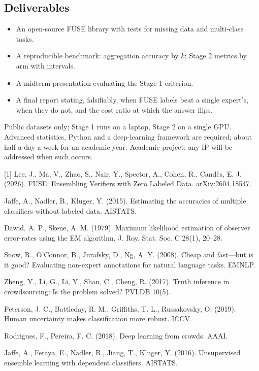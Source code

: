\documentclass[10pt]{article}
\newcommand{\secrule}[1]{\par\vspace{8pt}{\noindent\color{navy}\bfseries\fontsize{14}{16}\selectfont #1\par}\vspace{-5pt}{\color{navy}\rule{\linewidth}{0.7pt}}\par\vspace{1pt}}
\begin{document}
\subsection*{Deliverables}
\begin{itemize}
\item An open-source FUSE library with tests for missing data and multi-class tasks.
\item A reproducible benchmark: aggregation accuracy by $k$; Stage 2 metrics by arm with intervals.
\item A midterm presentation evaluating the Stage 1 criterion.
\item A final report stating, falsifiably, when FUSE labels beat a single expert's, when they do not, and the cost ratio at which the answer flips.
\end{itemize}

\secrule{Resources}

Public datasets only; Stage 1 runs on a laptop, Stage 2 on a single GPU. Advanced statistics, Python and a deep-learning framework are required; about half a day a week for an academic year. Academic project; any IP will be addressed when such occurs.

\secrule{Reference materials}

{\fontsize{8}{9.6}\selectfont
\setlength{\parskip}{1.5pt}\setlength{\parindent}{-12pt}\leftskip=12pt
[1] Lee, J., Ma, V., Zhao, S., Nair, Y., Spector, A., Cohen, R., Cand\`es, E. J. (2026). FUSE: Ensembling Verifiers with Zero Labeled Data. arXiv:2604.18547.\par
[2] Jaffe, A., Nadler, B., Kluger, Y. (2015). Estimating the accuracies of multiple classifiers without labeled data. AISTATS.\par
[3] Dawid, A. P., Skene, A. M. (1979). Maximum likelihood estimation of observer error-rates using the EM algorithm. J. Roy. Stat. Soc. C 28(1), 20--28.\par
[4] Snow, R., O'Connor, B., Jurafsky, D., Ng, A. Y. (2008). Cheap and fast---but is it good? Evaluating non-expert annotations for natural language tasks. EMNLP.\par
[5] Zheng, Y., Li, G., Li, Y., Shan, C., Cheng, R. (2017). Truth inference in crowdsourcing: Is the problem solved? PVLDB 10(5).\par
[6] Peterson, J. C., Battleday, R. M., Griffiths, T. L., Russakovsky, O. (2019). Human uncertainty makes classification more robust. ICCV.\par
[7] Rodrigues, F., Pereira, F. C. (2018). Deep learning from crowds. AAAI.\par
[8] Jaffe, A., Fetaya, E., Nadler, B., Jiang, T., Kluger, Y. (2016). Unsupervised ensemble learning with dependent classifiers. AISTATS.\par
}
\end{document}
